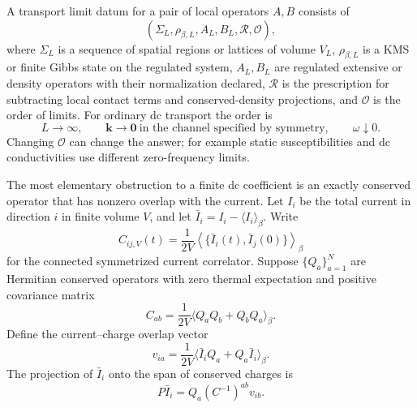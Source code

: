 \begin{definition}
\label{def:kubo-transport-limit-datum}
A transport limit datum for a pair of local operators \(A,B\) consists of
\[
  (\Sigma_L,\rho_{\beta,L},A_L,B_L,\mathcal R,\mathcal O),
\]
where \(\Sigma_L\) is a sequence of spatial regions or lattices of volume
\(V_L\), \(\rho_{\beta,L}\) is a KMS or finite Gibbs state on the regulated
system, \(A_L,B_L\) are regulated extensive or density operators with their
normalization declared, \(\mathcal R\) is the prescription for subtracting
local contact terms and conserved-density projections, and \(\mathcal O\) is
the order of limits.  For ordinary dc transport the order is
\begin{equation}
  L\to\infty,\qquad \mathbf k\to\mathbf0\ \text{in the channel specified by
  symmetry},\qquad \omega\downarrow0 .
  \label{eq:kubo-transport-order-of-limits}
\end{equation}
Changing \(\mathcal O\) can change the answer; for example static
susceptibilities and dc conductivities use different zero-frequency limits.
\end{definition}

The most elementary obstruction to a finite dc coefficient is an exactly
conserved operator that has nonzero overlap with the current.  Let \(I_i\) be
the total current in direction \(i\) in finite volume \(V\), and let
\(\bar I_i=I_i-\langle I_i\rangle_\beta\).  Write
\begin{equation}
  C_{ij,V}(t)
  =
  \frac1{2V}\left\langle
    \{\bar I_i(t),\bar I_j(0)\}
  \right\rangle_\beta
  \label{eq:kubo-finite-current-correlation}
\end{equation}
for the connected symmetrized current correlator.  Suppose
\(\{Q_a\}_{a=1}^N\) are Hermitian conserved operators with zero thermal
expectation and positive covariance matrix
\begin{equation}
  C_{ab}
  =
  \frac1{2V}\langle Q_aQ_b+Q_bQ_a\rangle_\beta .
  \label{eq:kubo-conserved-covariance}
\end{equation}
Define the current--charge overlap vector
\begin{equation}
  v_{ia}
  =
  \frac1{2V}\langle \bar I_iQ_a+Q_a\bar I_i\rangle_\beta .
  \label{eq:kubo-current-charge-overlap}
\end{equation}
The projection of \(\bar I_i\) onto the span of conserved charges is
\begin{equation}
  P\bar I_i
  =
  Q_a(C^{-1})^{ab}v_{ib}.
  \label{eq:kubo-mazur-projection}
\end{equation}

